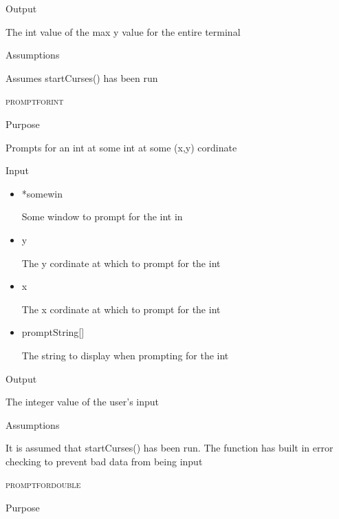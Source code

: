 \documentclass[pdftex, 11pt]{article}
\begin{document}
\begin{description}
\begin{description}
			\item{Output}

				The int value of the max y value for the entire terminal

			\item{Assumptions}

				Assumes startCurses() has been run

		\end{description}


	\item{\textsc{promptforint}}
		\begin{description}
			\item{Purpose}

				Prompts for an int at some int at some (x,y) cordinate

			\item{Input}

				\begin{itemize}

					\item{*somewin}

						Some window to prompt for the int in

					\item{y}

						The y cordinate at which to prompt
						for the int

					\item{x} 

						The x cordinate at which to prompt
						for the int

					\item{promptString[]}

						The string to display when prompting for
						the int
						
				\end{itemize}

			\item{Output}

				The integer value of the user's input

			\item{Assumptions}

				It is assumed that startCurses() has been run.
				The function has built in error checking to prevent
				bad data from being input

		\end{description}


	\item{\textsc{promptfordouble}}
		\begin{description}
			\item{Purpose}


\end{description}
\end{description}
\end{document}
